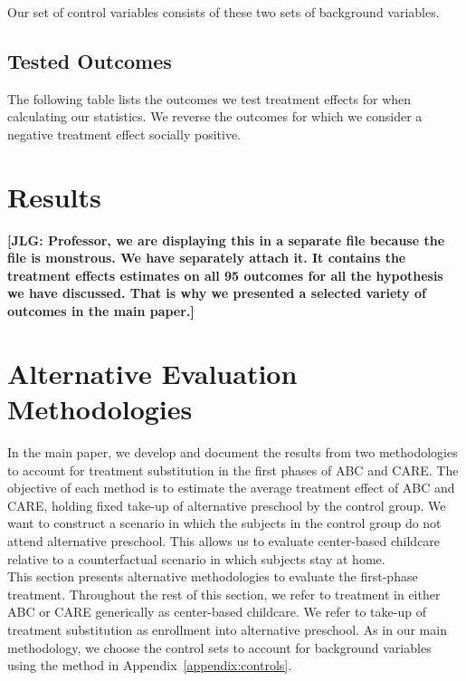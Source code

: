 \begin{appendices}
\noindent Our set of control variables consists of these two sets of background variables.

\singlespacing

\doublespacing
\subsection{Tested Outcomes}

\noindent The following table lists the outcomes we test treatment effects for when calculating our statistics. We reverse the outcomes for which we consider a negative treatment effect socially positive.

\singlespacing

\doublespacing

\setcounter{figure}{0}  \renewcommand{\thefigure}{C.\arabic{figure}}
\setcounter{table}{0}   \renewcommand{\thetable}{C.\arabic{table}}

\section{Results} \label{appendix:results}

\textbf{[JLG: Professor, we are displaying this in a separate file because the file is monstrous. We have separately attach it. It contains the treatment effects estimates on all 95 outcomes for all the hypothesis we have discussed. That is why we presented a selected variety of outcomes in the main paper.]}

\setcounter{figure}{0}  \renewcommand{\thefigure}{D.\arabic{figure}}
\setcounter{table}{0}   \renewcommand{\thetable}{D.\arabic{table}}
\section{Alternative Evaluation Methodologies} \label{appendix:amethodology}

\noindent In the main paper, we develop and document the results from two methodologies to account for treatment substitution in the first phases of ABC and CARE. The objective of each method is to estimate the average treatment effect of ABC and CARE, holding fixed take-up of alternative preschool by the control group. We want to construct a scenario in which the subjects in the control group do not attend alternative preschool. This allows us to evaluate center-based childcare relative to a counterfactual scenario in which subjects stay at home.\\

\noindent This section presents alternative methodologies to evaluate the first-phase treatment. Throughout the rest of this section, we refer to treatment in either ABC or CARE generically as center-based childcare. We refer to take-up of treatment substitution as enrollment into alternative preschool. As in our main methodology, we choose the control sets to account for background variables using the method in Appendix~\ref{appendix:controls}.\\


\end{appendices}
